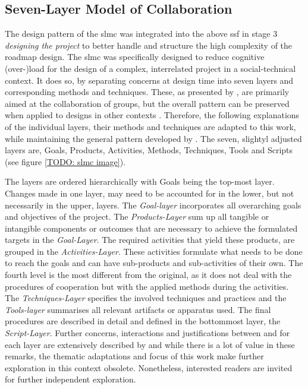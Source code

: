 \subsection{Seven-Layer Model of Collaboration}

The design pattern of the \acrshort*{slmc} was integrated into the above \acrshort*{ssf} in stage 3 \textit{designing the project} to better handle and structure the high complexity of the roadmap design. The \acrshort*{slmc} was specifically designed to reduce cognitive (over-)load for the design of a complex, interrelated project in a social-technical context. It does so, by separating concerns at design time into seven layers and  corresponding methods and techniques. These, as presented by \autocite{briggsSevenLayerModelCollaboration}, are primarily aimed at the collaboration of groups, but the overall pattern can be preserved when applied to designs in other contexts \autocite{diggelenGroundedDesignDesign2009}. Therefore, the following explanations of the individual layers, their methods and techniques are adapted to this work, while maintaining the general pattern developed by \autocite{briggsSevenLayerModelCollaboration}. The seven, slightyl adjusted layers are, Goals, Products, Activities, Methods, Techniques, Tools and Scripts (see figure \ref*{TODO: slmc image}). 


The layers are ordered hierarchically with Goals being the top-most layer. Changes made in one layer, may need to be accounted for in the lower, but not necessarily in the upper, layers. The \textit{Goal-layer} incorporates all overarching goals and objectives of the project. The \textit{Products-Layer} sum up all tangible or intangible components or outcomes that are necessary to achieve the formulated targets in the \textit{Goal-Layer}. The required activities that yield these products, are grouped in the \textit{Activities-Layer}. These activities formulate what needs to be done to reach the goals and can have sub-products and sub-activities of their own. The fourth level is the most different from the original, as it does not deal with the procedures of cooperation but with the applied methods during the activities. The \textit{Techniques-Layer} specifies the involved techniques and practices and the \textit{Tools-layer} summarises all relevant artifacts or apparatus used. The final procedures are described in detail and defined in the bottommost layer, the \textit{Script-Layer}. Further concerns, interactions and justifications between and for each layer are extensively described by \autocite{briggsSevenLayerModelCollaboration} and while there is a lot of value in these remarks, the thematic adaptations and focus of this work make further exploration in this context obsolete. Nonetheless, interested readers are invited for further independent exploration. 

